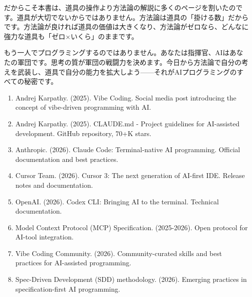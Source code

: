 だからこそ本書は、道具の操作より方法論の解説に多くのページを割いたのです。道具が大切でないからではありません。方法論は道具の「掛ける数」だからです。方法論が良ければ道具の価値は大きくなり、方法論がゼロなら、どんなに強力な道具も「ゼロ×いくら」のままです。

もう一人でプログラミングするのではありません。あなたは指揮官、AIはあなたの軍団です。思考の質が軍団の戦闘力を決めます。今日から方法論で自分の考えを武装し、道具で自分の能力を拡大しよう——それがAIプログラミングのすべての秘密です。


\begin{enumerate}
  \item Andrej Karpathy. (2025). Vibe Coding. Social media post introducing the concept of vibe-driven programming with AI.
  \item Andrej Karpathy. (2025). CLAUDE.md - Project guidelines for AI-assisted development. GitHub repository, 70+K stars.
  \item Anthropic. (2026). Claude Code: Terminal-native AI programming. Official documentation and best practices.
  \item Cursor Team. (2026). Cursor 3: The next generation of AI-first IDE. Release notes and documentation.
  \item OpenAI. (2026). Codex CLI: Bringing AI to the terminal. Technical documentation.
  \item Model Context Protocol (MCP) Specification. (2025-2026). Open protocol for AI-tool integration.
  \item Vibe Coding Community. (2026). Community-curated skills and best practices for AI-assisted programming.
  \item Spec-Driven Development (SDD) methodology. (2026). Emerging practices in specification-first AI programming.
\end{enumerate}
